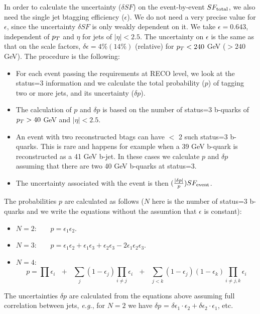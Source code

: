 In order to calculate the uncertainty ($\delta SF$) on the event-by-event $SF_{\rm total}$,
we also need the single jet btagging efficiency ($\epsilon$).  
We do not need a very precise value for $\epsilon$, since the uncertainty $\delta SF$ is 
only weakly dependent on it.  We take $\epsilon = 0.643$, independent of $p_T$
and $\eta$ for jets of $|\eta| < 2.5$.  The uncertainty on $\epsilon$ is 
the same as that on the scale factors, $\delta \epsilon = 4\% (14\%)$ (relative)
for $p_T < 240$ GeV ($> 240$ GeV).
The procedure is the following:
\begin{itemize}

\item For each event passing the requirements at RECO level, we look at the status=3 information
and we calculate the total probability ($p$) of tagging two or more jets, and 
its uncertainty ($\delta p$).

\item The calculation of $p$ and $\delta p$ is based on the number of status=3 b-quarks
of $p_T > 40$ GeV and $|\eta| < 2.5$.  

\item An event with two reconstructed btags can have $<$ 2 such status=3 b-quarks.  This 
is rare and happens for example when a 39 GeV b-quark is reconstructed as a 41 GeV
b-jet.  In these cases we calculate $p$ and $\delta p$ assuming that there are 
two 40 GeV b-quarks at status=3.

\item The uncertainty associated with the event is then $(\frac{|\delta p|}{p}) SF_{\rm event}$.

\end{itemize}

The probabilities $p$ are calculated as follows ($N$ here is the number of status=3 b-quarks
and we write the equations without the assumtion that $\epsilon$ is constant):

\begin{itemize}

\item $N=2$:~~~~$p = \epsilon_1 \epsilon_2$.

\item $N=3$:~~~~$p = \epsilon_1 \epsilon_2 + \epsilon_1 \epsilon_3 + \epsilon_2 \epsilon_3 -
2\epsilon_1 \epsilon_2 \epsilon_3$.

\item $N=4$:~~~~$$p = \prod{\epsilon_i}~~~+~~~\sum_j{(1-\epsilon_j)\prod_{i \ne j}{\epsilon_i}}
~~~+~~~\sum_{j<k}{(1-\epsilon_j)(1-\epsilon_k)\prod_{i \ne j,k}{\epsilon_i}}$$



\end{itemize}

The uncertainties $\delta p$ are calculated from the equations above assuming full 
correlation between jets, {\em e.g.}, for $N=2$ we have 
$\delta p$ = $\delta \epsilon_1 \cdot \epsilon_2 + \delta \epsilon_2 \cdot \epsilon_1$, etc.


